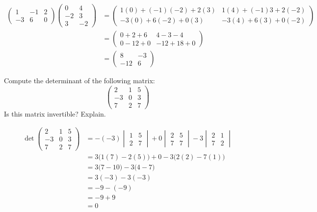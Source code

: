 \documentclass[11pt,letterpaper]{article}
\begin{document}
\sol
	\[
	\begin{aligned}
	\begin{pmatrix}
	1 & -1 & 2 \\
	-3 & 6 & 0
	\end{pmatrix}
	\begin{pmatrix}
	0 & 4 \\
	-2 & 3 \\
	3 & -2
	\end{pmatrix}&= 
	\begin{pmatrix}
	1(0) + (-1)(-2) + 2(3) & 1(4) + (-1)3 + 2(-2) \\
	-3(0) + 6(-2) + 0(3) & -3(4) + 6(3) + 0(-2) 
	\end{pmatrix} \\[0.3cm]
	&= 	
	\begin{pmatrix}
	0 + 2 + 6 & 4 - 3 - 4 \\
	0 - 12 + 0 & -12 + 18 + 0 
	\end{pmatrix} \\[0.3cm]
	&= 
	\begin{pmatrix}
	8 & -3 \\
	-12 & 6
	\end{pmatrix}	
	\end{aligned}
	\]





\newpage





 Compute the determinant of the following matrix:
	\[
	\begin{pmatrix}
	2 & 1 & 5 \\
	-3 & 0 & 3 \\
	7 & 2 & 7 
	\end{pmatrix}
	\]
Is this matrix invertible? Explain. \pspace

\sol
	\[
	\begin{aligned}
	\det 	\begin{pmatrix}
	2 & 1 & 5 \\
	-3 & 0 & 3 \\
	7 & 2 & 7 
	\end{pmatrix}&= -(-3) \begin{vmatrix} 1 & 5 \\ 2 & 7 \end{vmatrix} + 0 \begin{vmatrix} 2 & 5 \\ 7 & 7 \end{vmatrix} - 3 \begin{vmatrix} 2 & 1 \\ 7 & 2 \end{vmatrix} \\[0.3cm]
	&= 3 \big(1(7) - 2(5) \big) + 0 - 3 \big( 2(2) - 7(1) \big) \\[0.3cm]
	&= 3 \big( 7 - 10 \big) - 3 \big( 4 - 7 \big) \\[0.3cm]
	&= 3(-3) - 3(-3) \\[0.3cm]
	&= -9 - (-9) \\[0.3cm]
	&= -9 + 9 \\[0.3cm]
	&= 0 
	\end{aligned}
	\] \pspace
\end{document}
